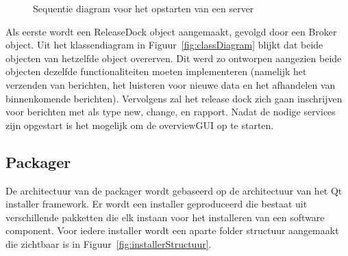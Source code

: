 \begin{figure}[!ht]
\centering
{}
\caption{Sequentie diagram voor het opstarten van een server}
\label{fig:seqStartServer}
\end{figure}

Als eerste wordt een ReleaseDock object aangemaakt, gevolgd door een Broker object.
Uit het klassendiagram in Figuur~\ref{fig:classDiagram} blijkt dat beide objecten van hetzelfde object overerven.
Dit werd zo ontworpen aangezien beide objecten dezelfde functionaliteiten moeten implementeren (namelijk het verzenden van berichten, het luisteren voor nieuwe data en het afhandelen van binnenkomende berichten).
Vervolgens zal het release dock zich gaan inschrijven voor berichten met als type new, change, en rapport.
Nadat de nodige services zijn opgestart is het mogelijk om de overviewGUI op te starten.

\subsection{Packager}
De architectuur van de packager wordt gebaseerd op de architectuur van het Qt installer framework.
Er wordt een installer geproduceerd die bestaat uit verschillende pakketten die elk instaan voor het installeren van een software component.
Voor iedere installer wordt een aparte folder structuur aangemaakt die zichtbaar is in Figuur~\vref{fig:installerStructuur}.

